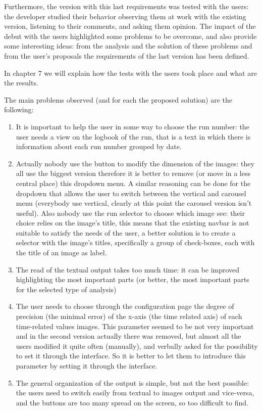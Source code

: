 Furthermore, the version with this last requirements was tested with the users: the developer studied their behavior observing them at work with the existing version, listening to their comments, and asking them opinion. The impact of the debut with the users highlighted some problems to be overcome, and also provide some interesting ideas: from the analysis and the solution of these problems and from the user's proposals the requirements of the last version has been defined. 

In chapter 7 we will explain how the tests with the users took place and what are the results.

The main problems observed (and for each the proposed solution) are the following:

\begin{enumerate}
\item 
It is important to help the user in some way to choose the run number: the user needs a view on the logbook of the run, that is a text in which there is information about each run number grouped by date.

\item
Actually nobody use the button to modify the dimension of the images: they all use the biggest version therefore it is better to remove (or move in a less central place) this dropdown menu. A similar reasoning can be done for the dropdown that allows the user to switch between the vertical and carousel menu (everybody use vertical, clearly at this point the carousel version isn't useful). Also nobody use the run selector to choose which image see: their choice relies on the image's title, this means that the existing navbar is not suitable to satisfy the needs of the user, a better solution is to create a selector with the image's titles, specifically a group of check-boxes, each with the title of an image as label.  

\item
The read of the textual output takes too much time: it can be improved highlighting the most important parts (or better, the most important parts for the selected type of analysis)

\item
The user needs to choose through the configuration page the degree of precision (the minimal error) of the x-axis (the time related axis) of each time-related values images. This parameter seemed to be not very important and in the second version actually there was removed, but almost all the users modified it quite often (manually), and verbally asked for the possibility to set it through the interface. So it is better to let them to introduce this parameter by setting it through the interface.

\item
The general organization of the output is simple, but not the best possible: the users need to switch easily from textual to images output and vice-versa, and the buttons are too many spread on the screen, so too difficult to find.

\end{enumerate}

